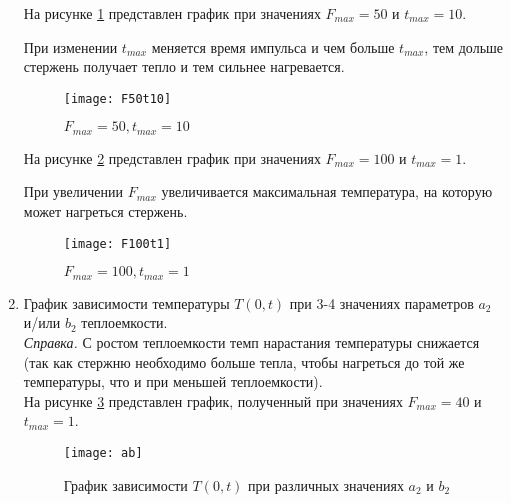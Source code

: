 \documentclass[a4paper, 14pt]{article}
\begin{document}
\begin{enumerate}
На рисунке \ref{F50t10} представлен график при значениях $F_{max} = 50$ и  $t_{max} = 10$.

При изменении $t_{max}$ меняется время импульса и чем больше $t_{max}$, тем дольше стержень получает тепло и тем сильнее нагревается.

\begin{figure}[H]
        	\begin{center}
        		\texttt{[image: F50t10]}
        		\caption{$F_{max} = 50, t_{max} = 10$}
        		\label{F50t10}
        	\end{center}
\end{figure}

\newpage
На рисунке \ref{F100t1} представлен график при значениях $F_{max} = 100$ и  $t_{max} = 1$.

При увеличении $F_{max}$ увеличивается максимальная температура, на которую может нагреться стержень.

\begin{figure}[H]
        	\begin{center}
        		\texttt{[image: F100t1]}
        		\caption{$F_{max} = 100, t_{max} = 1$}
        		\label{F100t1}
        	\end{center}
\end{figure}

\item График зависимости температуры $T(0,t)$  при 3-4 значениях параметров  $a_2$  и/или  $b_2$  теплоемкости. \\

\textit{Справка.} С ростом теплоемкости темп нарастания температуры снижается (так как стержню необходимо больше тепла, чтобы нагреться до той же температуры, что и при меньшей теплоемкости).\\

На рисунке \ref{ab} представлен график, полученный при значениях $F_{max} = 40$ и  $t_{max} = 1$. 

\begin{figure}[H]
        	\begin{center}
        		\texttt{[image: ab]}
        		\caption{График зависимости $T(0,t)$ при различных значениях $a_2$ и $b_2$}
        		\label{ab}
        	\end{center}
\end{figure}


\end{enumerate}
\end{document}
